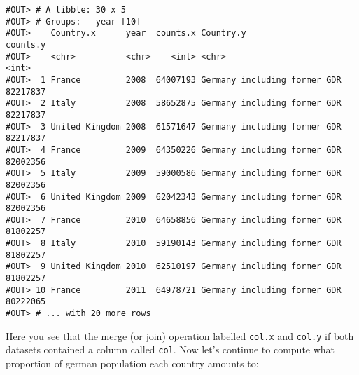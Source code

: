 \documentclass[]{book}
\newenvironment{Shaded}{\begin{snugshade}}{\end{snugshade}}
\newcommand{\CommentTok}[1]{\textcolor[rgb]{0.56,0.35,0.01}{\textit{#1}}}
\newcommand{\DataTypeTok}[1]{\textcolor[rgb]{0.13,0.29,0.53}{#1}}
\newcommand{\DecValTok}[1]{\textcolor[rgb]{0.00,0.00,0.81}{#1}}
\newcommand{\KeywordTok}[1]{\textcolor[rgb]{0.13,0.29,0.53}{\textbf{#1}}}
\newcommand{\NormalTok}[1]{#1}
\newcommand{\OperatorTok}[1]{\textcolor[rgb]{0.81,0.36,0.00}{\textbf{#1}}}
\newcommand{\StringTok}[1]{\textcolor[rgb]{0.31,0.60,0.02}{#1}}
\begin{document}
\begin{verbatim}
#OUT> # A tibble: 30 x 5
#OUT> # Groups:   year [10]
#OUT>    Country.x      year  counts.x Country.y                    counts.y
#OUT>    <chr>          <chr>    <int> <chr>                           <int>
#OUT>  1 France         2008  64007193 Germany including former GDR 82217837
#OUT>  2 Italy          2008  58652875 Germany including former GDR 82217837
#OUT>  3 United Kingdom 2008  61571647 Germany including former GDR 82217837
#OUT>  4 France         2009  64350226 Germany including former GDR 82002356
#OUT>  5 Italy          2009  59000586 Germany including former GDR 82002356
#OUT>  6 United Kingdom 2009  62042343 Germany including former GDR 82002356
#OUT>  7 France         2010  64658856 Germany including former GDR 81802257
#OUT>  8 Italy          2010  59190143 Germany including former GDR 81802257
#OUT>  9 United Kingdom 2010  62510197 Germany including former GDR 81802257
#OUT> 10 France         2011  64978721 Germany including former GDR 80222065
#OUT> # ... with 20 more rows
\end{verbatim}

Here you see that the merge (or join) operation labelled \texttt{col.x} and \texttt{col.y} if
both datasets contained a column called \texttt{col}. Now let's continue to compute what proportion of german population each country amounts to:

\begin{Shaded}
\end{Shaded}
\end{document}
